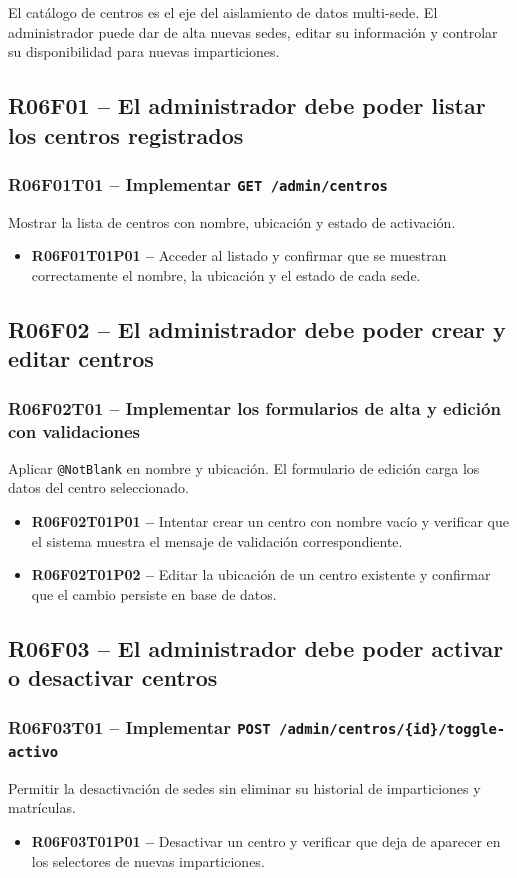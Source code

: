 \documentclass[12pt, a4paper]{report}
\begin{document}
El catálogo de centros es el eje del aislamiento de datos multi-sede. El administrador puede dar de alta nuevas sedes, editar su información y controlar su disponibilidad para nuevas imparticiones.

\subsection{R06F01 -- El administrador debe poder listar los centros registrados}

\subsubsection{R06F01T01 -- Implementar \texttt{GET /admin/centros}}
Mostrar la lista de centros con nombre, ubicación y estado de activación.
\begin{itemize}
  \item \textbf{R06F01T01P01 --} Acceder al listado y confirmar que se muestran correctamente el nombre, la ubicación y el estado de cada sede.
\end{itemize}

\subsection{R06F02 -- El administrador debe poder crear y editar centros}

\subsubsection{R06F02T01 -- Implementar los formularios de alta y edición con validaciones}
Aplicar \texttt{@NotBlank} en nombre y ubicación. El formulario de edición carga los datos del centro seleccionado.
\begin{itemize}
  \item \textbf{R06F02T01P01 --} Intentar crear un centro con nombre vacío y verificar que el sistema muestra el mensaje de validación correspondiente.
  \item \textbf{R06F02T01P02 --} Editar la ubicación de un centro existente y confirmar que el cambio persiste en base de datos.
\end{itemize}

\subsection{R06F03 -- El administrador debe poder activar o desactivar centros}

\subsubsection{R06F03T01 -- Implementar \texttt{POST /admin/centros/\{id\}/toggle-activo}}
Permitir la desactivación de sedes sin eliminar su historial de imparticiones y matrículas.
\begin{itemize}
  \item \textbf{R06F03T01P01 --} Desactivar un centro y verificar que deja de aparecer en los selectores de nuevas imparticiones.
\end{itemize}
\end{document}
